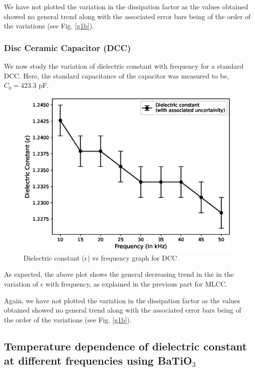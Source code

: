 	We have not plotted the variation in the dissipation factor as the values obtained showed no general trend along with the associated error bars being of the order of the variations (see Fig. \ref{g1b}). 

	\subsubsection{Disc Ceramic Capacitor (DCC)}
	\noindent We now study the variation of dielectric constant with frequency for a standard DCC. Here, the standard capacitance of the capacitor was measured to be, $C_0 = 423.3$ pF. 
	
	\begin{figure}[H]
		\centering
		\label{graph:4}
		\includegraphics[width=1\columnwidth]{images/disc_e.eps}
		\caption{Dielectric constant ($\epsilon$) vs frequency graph for DCC}
	\end{figure}
	As expected, the above plot shows the general decreasing trend in the in the variation of $\epsilon$ with frequency, as explained in the previous part for MLCC.

	Again, we have not plotted the variation in the dissipation factor as the values obtained showed no general trend along with the associated error bars being of the order of the variations (see Fig. \ref{g1b}). 

\subsection{Temperature dependence of dielectric constant at different frequencies using BaTiO$_3$}

